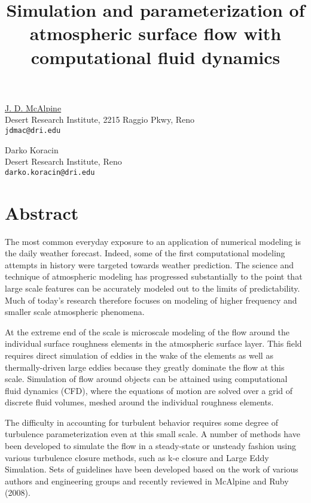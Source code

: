 \title{Simulation and parameterization of atmospheric surface flow with computational fluid dynamics}
\author{} \institute{}
\maketitle

\begin{center}
{\large \underline{J. D. McAlpine}}\\
Desert Research Institute, 2215 Raggio Pkwy, Reno\\
{\tt jdmac@dri.edu}\\
\vspace{4mm}

{\large Darko Koracin}\\
Desert Research Institute, Reno\\
{\tt darko.koracin@dri.edu}
\end{center}

\section*{Abstract}
The most common everyday exposure to an application of numerical modeling is the daily weather forecast. Indeed, some of the first computational modeling attempts in history were targeted towards weather prediction. The science and technique of atmospheric modeling has progressed substantially to the point that large scale features can be accurately modeled out to the limits of predictability. Much of today\textquoteright s research therefore focuses on modeling of higher frequency and smaller scale atmospheric phenomena.

At the extreme end of the scale is microscale modeling of the flow around the individual surface roughness elements in the atmospheric surface layer. This field requires direct simulation of eddies in the wake of the elements as well as thermally-driven large eddies because they greatly dominate the flow at this scale. Simulation of flow around objects can be attained using computational fluid dynamics (CFD), where the equations of motion are solved over a grid of discrete  fluid volumes, meshed around the individual roughness elements.

The difficulty in accounting for turbulent behavior requires some degree of turbulence parameterization even at this small scale. A number of methods have been developed to simulate the flow in a steady-state or unsteady fashion using various turbulence closure methods, such as k-e closure and Large Eddy Simulation. Sets of guidelines have been developed based on the work of various authors and engineering groups and recently reviewed in McAlpine and Ruby (2008).


